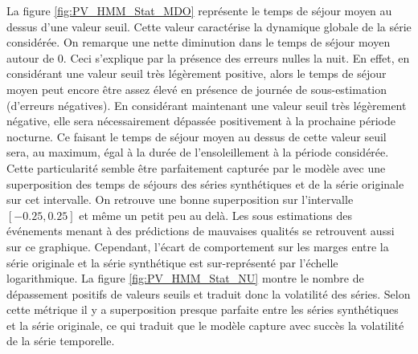 \documentclass[12pt, french]{report}
\begin{document}
La figure \ref{fig:PV_HMM_Stat_MDO} représente le temps de séjour moyen au dessus d'une valeur seuil. Cette valeur caractérise la dynamique globale de la série considérée. On remarque une nette diminution dans le temps de séjour moyen autour de 0. Ceci s'explique par la présence des erreurs nulles la nuit. En effet, en considérant une valeur seuil très légèrement positive, alors le temps de séjour moyen peut encore être assez élevé en présence de journée de sous-estimation (d'erreurs négatives). En considérant maintenant une valeur seuil très légèrement négative, elle sera nécessairement dépassée positivement à la prochaine période nocturne. Ce faisant le temps de séjour moyen au dessus de cette valeur seuil sera, au maximum, égal à la durée de l'ensoleillement à la période considérée. Cette particularité semble être parfaitement capturée par le modèle avec une superposition des temps de séjours des séries synthétiques et de la série originale sur cet intervalle. On retrouve une bonne superposition sur l'intervalle $[-0.25,0.25]$ et même un petit peu au delà. Les sous estimations des événements menant à des prédictions de mauvaises qualités se retrouvent aussi sur ce graphique. Cependant, l'écart de comportement sur les marges entre la série originale et la série synthétique est sur-représenté par l'échelle logarithmique. La figure \ref{fig:PV_HMM_Stat_NU} montre le nombre de dépassement positifs de valeurs seuils et traduit donc la volatilité des séries. Selon cette métrique il y a superposition presque parfaite entre les séries synthétiques et la série originale, ce qui traduit que le modèle capture avec succès la volatilité de la série temporelle.
\end{document}
